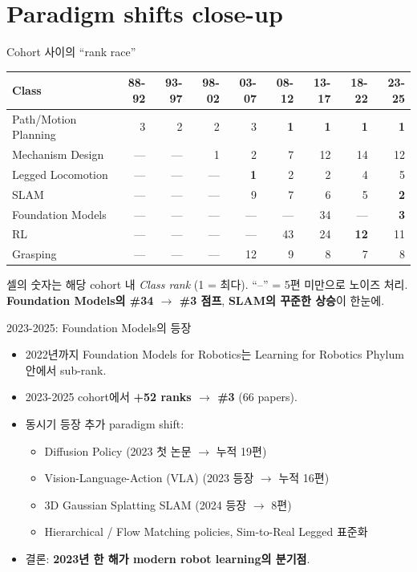 \documentclass[aspectratio=169,t]{beamer}
\newcommand{\hot}[1]{\textcolor{accentorange}{\textbf{#1}}}
\newcommand{\cool}[1]{\textcolor{accentblue}{\textbf{#1}}}
\newcommand{\muted}[1]{\textcolor{mutedgray}{#1}}
\begin{document}
\section{Paradigm shifts close-up}

\begin{frame}{Cohort 사이의 ``rank race''}
\small
\begin{tabular}{@{}lrrrrrrrr@{}}
\toprule
\textbf{Class} & \textbf{88-92} & \textbf{93-97} & \textbf{98-02} & \textbf{03-07} & \textbf{08-12} & \textbf{13-17} & \textbf{18-22} & \textbf{23-25} \\
\midrule
Path/Motion Planning  & 3 & 2 & 2 & 3 & \cool{1} & \cool{1} & \cool{1} & \cool{1} \\
Mechanism Design      & — & — & 1 & 2 & 7 & 12 & 14 & 12 \\
Legged Locomotion     & — & — & — & \cool{1} & 2 & 2 & 4 & 5 \\
SLAM                  & — & — & — & 9 & 7 & 6 & 5 & \hot{2} \\
Foundation Models     & — & — & — & — & — & 34 & — & \hot{3} \\
RL                    & — & — & — & — & 43 & 24 & \hot{12} & 11 \\
Grasping              & — & — & — & 12 & 9 & 8 & 7 & 8 \\
\bottomrule
\end{tabular}
\vfill
\muted{셀의 숫자는 해당 cohort 내 \emph{Class rank} (1 = 최다). ``--'' = 5편 미만으로 노이즈 처리.}\\
\hot{Foundation Models의 \#34 $\to$ \#3 점프}, \cool{SLAM의 꾸준한 상승}이 한눈에.
\end{frame}

\begin{frame}{2023-2025: Foundation Models의 등장}
\begin{itemize}
  \item 2022년까지 Foundation Models for Robotics는 Learning for Robotics Phylum 안에서 sub-rank.
  \item 2023-2025 cohort에서 \hot{+52 ranks $\to$ \#3} (66 papers).
  \item 동시기 등장 추가 paradigm shift:
  \begin{itemize}
    \item Diffusion Policy (2023 첫 논문 $\to$ 누적 19편)
    \item Vision-Language-Action (VLA) (2023 등장 $\to$ 누적 16편)
    \item 3D Gaussian Splatting SLAM (2024 등장 $\to$ 8편)
    \item Hierarchical / Flow Matching policies, Sim-to-Real Legged 표준화
  \end{itemize}
  \item 결론: \cool{2023년 한 해가 modern robot learning의 분기점}.
\end{itemize}
\end{frame}
\end{document}
